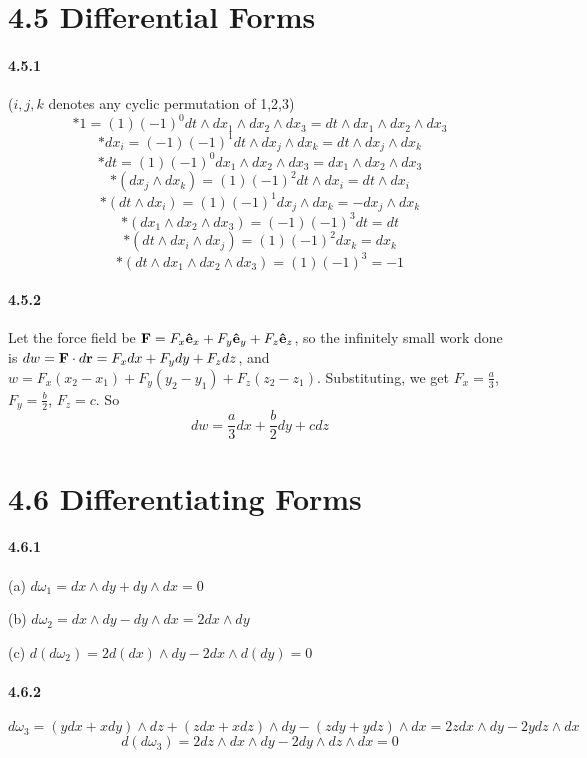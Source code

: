\documentclass[a4paper]{article}
\begin{document}
\section*{4.5 Differential Forms}

\paragraph{4.5.1}
($i,j,k$ denotes any cyclic permutation of 1,2,3)
\[
*1=(1)(-1)^0dt\wedge dx_1\wedge dx_2\wedge dx_3=dt\wedge dx_1\wedge dx_2\wedge dx_3\]
\[
*dx_i=(-1)(-1)^1dt\wedge dx_j\wedge dx_k=dt\wedge dx_j\wedge dx_k
\]
\[
*dt=(1)(-1)^0dx_1\wedge dx_2\wedge dx_3=dx_1\wedge dx_2\wedge dx_3
\]
\[
*(dx_j\wedge dx_k)=(1)(-1)^2dt\wedge dx_i=dt\wedge dx_i
\]
\[
*(dt\wedge dx_i)=(1)(-1)^1dx_j\wedge dx_k=-dx_j\wedge dx_k
\]
\[
*(dx_1\wedge dx_2\wedge dx_3)=(-1)(-1)^3dt=dt
\]
\[
*(dt\wedge dx_i\wedge dx_j)=(1)(-1)^2dx_k=dx_k
\]
\[
*(dt\wedge dx_1\wedge dx_2\wedge dx_3)=(1)(-1)^3=-1
\]

\paragraph{4.5.2}
Let the force field be $\mathbf{F}=F_x\mathbf{\hat{e}}_x+F_y\mathbf{\hat{e}}_y+F_z\mathbf{\hat{e}}_z$, so the infinitely small work done is $dw=\mathbf{F}\cdot d\mathbf{r}=F_xdx+F_ydy+F_zdz$, and $w=F_x(x_2-x_1)+F_y(y_2-y_1)+F_z(z_2-z_1)$. Substituting, we get $F_x=\frac{a}{3}$, $F_y=\frac{b}{2}$, $F_z=c$. So
\[
dw=\frac{a}{3}dx+\frac{b}{2}dy+cdz
\]

\section*{4.6 Differentiating Forms}

\paragraph{4.6.1}
(a) $d\omega_1=dx\wedge dy+dy\wedge dx=0$

(b) $d\omega_2=dx\wedge dy-dy\wedge dx=2dx\wedge dy$
 
(c) $d(d\omega_2)=2d(dx)\wedge dy-2dx\wedge d(dy)=0$

\paragraph{4.6.2}
\[
d\omega_3=(ydx+xdy)\wedge dz+(zdx+xdz)\wedge dy-(zdy+ydz)\wedge dx=2zdx\wedge dy-2ydz\wedge dx
\]
\[
d(d\omega_3)=2dz\wedge dx\wedge dy-2dy\wedge dz\wedge dx=0
\]
\end{document}
